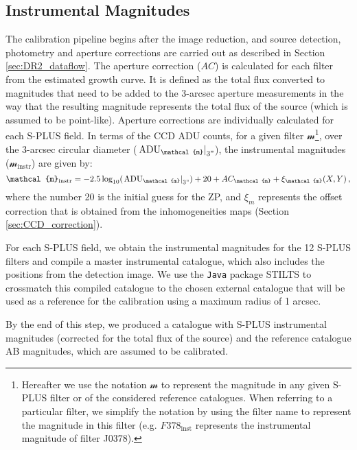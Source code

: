 \documentclass[fleqn,usenatbib]{mnras}
\begin{document}
\subsection{Instrumental Magnitudes}

The calibration pipeline begins after the image reduction, and source detection, photometry and aperture corrections are carried out as described in Section \ref{sec:DR2_dataflow}. The aperture correction ($AC$) is calculated for each filter from the estimated growth curve. It is defined as the total flux converted to magnitudes that need to be added to the 3-arcsec aperture measurements in the way that the resulting magnitude represents the total flux of the source (which is assumed to be point-like). Aperture corrections are individually calculated for each S-PLUS field. In terms of the CCD ADU counts, for a given filter $\mathcal{m}$\footnote{Hereafter we use the notation $\mathcal{m}$ to represent the magnitude in any given S-PLUS filter or of the considered reference catalogues. When referring to a particular filter, we simplify the notation by using the filter name to represent the magnitude in this filter (e.g. $F378_\mathrm{inst}$ represents the instrumental magnitude of filter J0378).}, over the 3-arcsec circular diameter ($\left. \mathrm{ADU}_\mathcal{m}\right|_{3"}$), the instrumental magnitudes ($ \mathcal{m}_{\mathrm{instr}}$) are given by:
%
\begin{equation}
    \mathcal{m}_{\mathrm{instr}} = -2.5 \log_{10}(\left. \mathrm{ADU}_\mathcal{m} \right|_{\mathrm{3"}}) + 20 + AC_\mathcal{m} + \xi_\mathcal{m}(X,Y)\,\mathrm{,}
\label{eq:instrumental_mags}
\end{equation}
where the number 20 is the initial guess for the ZP, and $\xi_m$ represents the offset correction that is obtained from the inhomogeneities maps (Section \ref{sec:CCD_correction}).

For each S-PLUS field, we obtain the instrumental magnitudes for the 12 S-PLUS filters and compile a master instrumental catalogue, which also includes the positions from the detection image. We use the \texttt{Java} package STILTS \citep{Taylor2006} to crossmatch this compiled catalogue to the chosen external catalogue that will be used as a reference for the calibration using a maximum radius of 1 arcsec.

By the end of this step, we produced a catalogue with S-PLUS instrumental magnitudes (corrected for the total flux of the source) and the reference catalogue AB magnitudes, which are assumed to be calibrated. 
\end{document}
